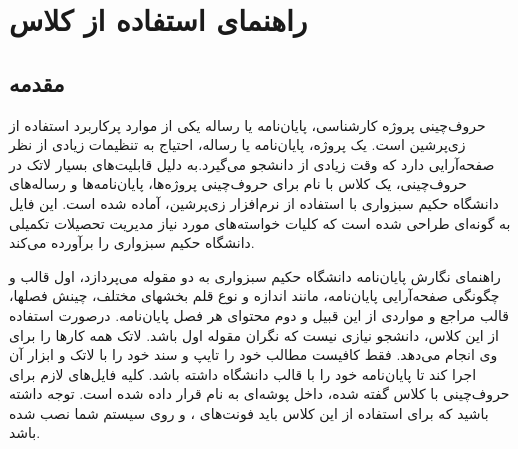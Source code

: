 
\chapter{راهنمای استفاده از کلاس}
\thispagestyle{empty}
\section{مقدمه}
حروف‌چینی پروژه کارشناسی، پایان‌نامه یا رساله یکی از موارد پرکاربرد استفاده از زی‌پرشین\cite{Khalighi87xepersian} است.  یک پروژه، پایان‌نامه یا رساله،  احتیاج به تنظیمات زیادی از نظر صفحه‌آرایی  دارد که وقت زیادی از دانشجو می‌گیرد.به دلیل قابلیت‌های بسیار لاتک در حروف‌چینی، یک کلاس با نام 
 برای حروف‌چینی پروژه‌ها، پایان‌نامه‌ها و رساله‌های دانشگاه حکیم سبزواری با استفاده از نرم‌افزار زی‌پرشین،  آماده شده است. این فایل به 
گونه‌ای طراحی شده است که کلیات خواسته‌های مورد نیاز  مدیریت تحصیلات تکمیلی دانشگاه حکیم سبزواری
 را برآورده می‌کند.%

راهنمای نگارش پایان‌نامه دانشگاه حکیم سبزواری به دو مقوله می‌پردازد، اول قالب و چگونگی صفحه‌آرایی پایان‌نامه، مانند اندازه و نوع قلم بخشهای مختلف، چینش فصلها، قالب مراجع و مواردی از این قبیل و دوم محتوای هر فصل پایان‌نامه. 
درصورت استفاده از این کلاس، دانشجو  نیازی نیست که نگران مقوله اول باشد. لاتک همه کارها را برای وی انجام می‌دهد. فقط کافیست مطالب خود را تایپ و سند خود را با لاتک و ابزار آن اجرا کند تا پایان‌نامه خود را با قالب دانشگاه داشته باشد.
کلیه فایل‌های لازم برای حروف‌چینی با کلاس گفته شده، داخل پوشه‌ای به نام
  قرار داده شده است. توجه داشته باشید که برای استفاده از این کلاس باید فونت‌های
  ،
و
    روی سیستم شما نصب شده باشد.
